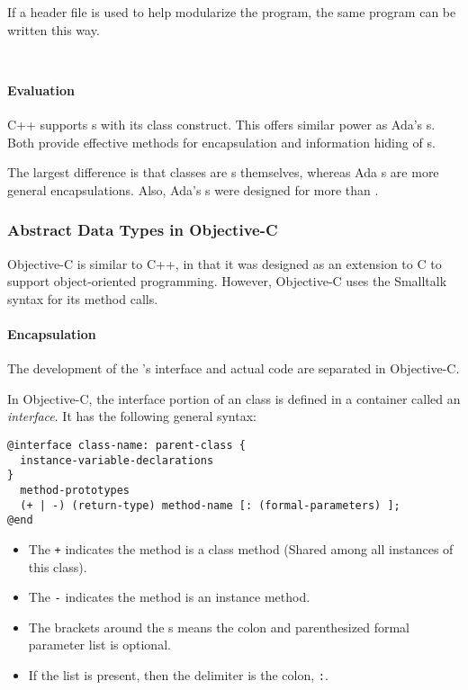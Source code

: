 If a header file is used to help modularize the program, the same program can be written this way.
\inputminted[frame=lines,linenos]{c++}{./EDAP05-Concepts_Programming_Languages-Sections/Code/Class_Example-Stack-Header-CPP.hpp}
\inputminted[frame=lines,linenos]{c++}{./EDAP05-Concepts_Programming_Languages-Sections/Code/Class_Example-Stack-Header-CPP.cpp}

\paragraph{Evaluation}\label{par:C++_Abstract_Data_Type_Evaluation}
C++ supports s with its class construct.
This offers similar power as Ada's s.
Both provide effective methods for encapsulation and information hiding of s.

The largest difference is that classes are s themselves, whereas Ada s are more general encapsulations.
Also, Ada's s were designed for more than .

\subsubsection{Abstract Data Types in Objective-C}\label{subsubsec:Abstract_Data_Types_Objective_C}
Objective-C is similar to C++, in that it was designed as an extension to C to support object-oriented programming.
However, Objective-C uses the Smalltalk syntax for its method calls.

\paragraph{Encapsulation}\label{par:Objective_C_Encapsulation}
The development of the 's interface and actual code are separated in Objective-C.
\begin{definition}[Interface]\label{def:Objective_C_Class_Interface}
  In Objective-C, the interface portion of an  class is defined in a container called an \emph{interface}.
  It has the following general syntax:
\begin{verbatim}
@interface class-name: parent-class {
  instance-variable-declarations
}
  method-prototypes
  (+ | -) (return-type) method-name [: (formal-parameters) ];
@end
\end{verbatim}
  \begin{itemize}[noitemsep]
  \item The \texttt{+} indicates the method is a class method (Shared among all instances of this class).
  \item The \texttt{-} indicates the method is an instance method.
  \item The brackets around the s means the colon and parenthesized formal parameter list is optional.
  \item If the list is present, then the delimiter is the colon, \texttt{:}.
  \end{itemize}
\end{definition}

